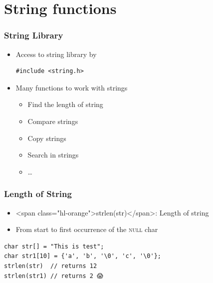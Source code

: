 \documentclass{../c-lecture}
\begin{document}
\section{String functions}

\begin{frame}[fragile]
  \frametitle{String Library}
  \begin{itemize}
    \item Access to string library by
    \begin{verbatim}
#include <string.h>
    \end{verbatim}
    \item Many functions to work with strings
    \begin{itemize}
      \item Find the length of string
      \item Compare strings
      \item Copy strings
      \item Search in strings
      \item \ldots
    \end{itemize}
  \end{itemize}
\end{frame}

\begin{frame}[fragile]
  \frametitle{Length of String}
  \begin{itemize}
    \item <span class="hl-orange">strlen(str)</span>: Length of string
    \item
      From start to first occurrence of the
      \textsc{\color{LimeGreen} null} char

  \end{itemize}
  \begin{verbatim}
char str[] = "This is test";
char str1[10] = {'a', 'b', '\0', 'c', '\0'};
strlen(str)  // returns 12
strlen(str1) // returns 2 😱
  \end{verbatim}
\end{frame}
\end{document}
